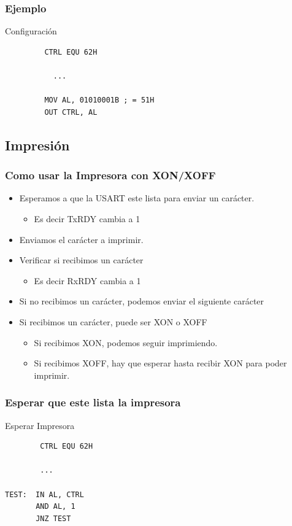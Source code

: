 \documentclass{beamer}
\begin{document}
\begin{frame}[fragile]
\frametitle{Ejemplo}
\begin{block}{Configuración}
 \begin{verbatim}
         CTRL EQU 62H
         
           ...
           
         MOV AL, 01010001B ; = 51H
         OUT CTRL, AL
 \end{verbatim}
\end{block}

\end{frame}

\subsection{Impresión}
\begin{frame}[fragile]
\frametitle{Como usar la Impresora con XON/XOFF}

\begin{itemize}
\item Esperamos a que la USART este lista para enviar un carácter. 
\begin{itemize}
\item Es decir TxRDY cambia a 1 
\end{itemize}
\item Enviamos el carácter a imprimir. 
\item Verificar si recibimos un carácter
\begin{itemize}
 \item Es decir RxRDY cambia a 1
\end{itemize}
\item Si no recibimos un carácter, podemos enviar el siguiente carácter
\item Si recibimos un carácter, puede ser XON o XOFF
\begin{itemize}
\item Si recibimos XON, podemos seguir imprimiendo.
\item Si recibimos XOFF, hay que esperar hasta recibir XON para poder imprimir.
\end{itemize}
\end{itemize}

\end{frame}

\begin{frame}[fragile]
\frametitle{Esperar que este lista la impresora}
\begin{block}{Esperar Impresora}
 \begin{verbatim}
        CTRL EQU 62H
         
        ...
           
TEST:  IN AL, CTRL
       AND AL, 1
       JNZ TEST
             
 \end{verbatim}
\end{block}

\end{frame}
\end{document}
